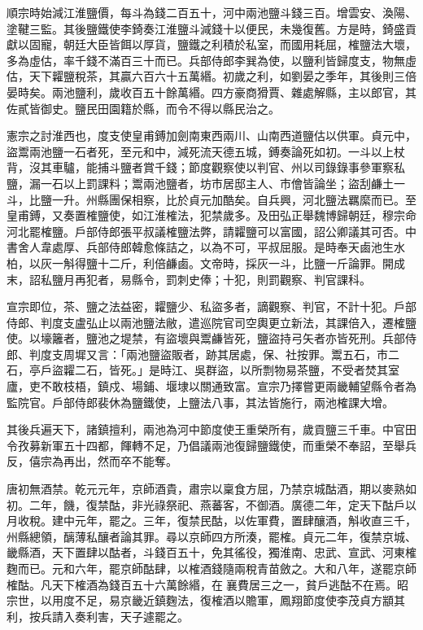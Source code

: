 \begin{pinyinscope}
 順宗時始減江淮鹽價，每斗為錢二百五十，河中兩池鹽斗錢三百。增雲安、渙陽、塗鞬三監。其後鹽鐵使李錡奏江淮鹽斗減錢十以便民，未幾復舊。方是時，錡盛貢獻以固寵，朝廷大臣皆餌以厚貨，鹽鐵之利積於私室，而國用耗屈，榷鹽法大壞，多為虛估，率千錢不滿百三十而已。兵部侍郎李巽為使，以鹽利皆歸度支，物無虛估，天下糶鹽稅茶，其贏六百六十五萬緡。初歲之利，如劉晏之季年，其後則三倍晏時矣。兩池鹽利，歲收百五十餘萬緡。四方豪商猾賈、雜處解縣，主以郎官，其佐貳皆御史。鹽民田園籍於縣，而令不得以縣民治之。



 憲宗之討淮西也，度支使皇甫鎛加劍南東西兩川、山南西道鹽估以供軍。貞元中，盜鬻兩池鹽一石者死，至元和中，減死流天德五城，鎛奏論死如初。一斗以上杖背，沒其車驢，能捕斗鹽者賞千錢；節度觀察使以判官、州以司錄錄事參軍察私鹽，漏一石以上罰課料；鬻兩池鹽者，坊市居邸主人、市儈皆論坐；盜刮鹻土一斗，比鹽一升。州縣團保相察，比於貞元加酷矣。自兵興，河北鹽法羈縻而已。至皇甫鎛，又奏置榷鹽使，如江淮榷法，犯禁歲多。及田弘正舉魏博歸朝廷，穆宗命河北罷榷鹽。戶部侍郎張平叔議榷鹽法弊，請糶鹽可以富國，詔公卿議其可否。中書舍人韋處厚、兵部侍郎韓愈條詰之，以為不可，平叔屈服。是時奉天鹵池生水柏，以灰一斛得鹽十二斤，利倍鹻鹵。文帝時，採灰一斗，比鹽一斤論罪。開成末，詔私鹽月再犯者，易縣令，罰刺史俸；十犯，則罰觀察、判官課科。



 宣宗即位，茶、鹽之法益密，糶鹽少、私盜多者，謫觀察、判官，不計十犯。戶部侍郎、判度支盧弘止以兩池鹽法敝，遣巡院官司空輿更立新法，其課倍入，遷榷鹽使。以壕籬者，鹽池之堤禁，有盜壞與鬻鹻皆死，鹽盜持弓矢者亦皆死刑。兵部侍郎、判度支周墀又言：「兩池鹽盜販者，跡其居處，保、社按罪。鬻五石，市二石，亭戶盜糶二石，皆死。」是時江、吳群盜，以所剽物易茶鹽，不受者焚其室廬，吏不敢枝梧，鎮戍、場鋪、堰埭以關通致富。宣宗乃擇嘗更兩畿輔望縣令者為監院官。戶部侍郎裴休為鹽鐵使，上鹽法八事，其法皆施行，兩池榷課大增。



 其後兵遍天下，諸鎮擅利，兩池為河中節度使王重榮所有，歲貢鹽三千車。中官田令孜募新軍五十四都，餫轉不足，乃倡議兩池復歸鹽鐵使，而重榮不奉詔，至舉兵反，僖宗為再出，然而卒不能奪。



 唐初無酒禁。乾元元年，京師酒貴，肅宗以稟食方屈，乃禁京城酤酒，期以麥熟如初。二年，饑，復禁酤，非光祿祭祀、燕蕃客，不御酒。廣德二年，定天下酤戶以月收稅。建中元年，罷之。三年，復禁民酤，以佐軍費，置肆釀酒，斛收直三千，州縣總領，醨薄私釀者論其罪。尋以京師四方所湊，罷榷。貞元二年，復禁京城、畿縣酒，天下置肆以酤者，斗錢百五十，免其徭役，獨淮南、忠武、宣武、河東榷麴而已。元和六年，罷京師酤肆，以榷酒錢隨兩稅青苗斂之。大和八年，遂罷京師榷酤。凡天下榷酒為錢百五十六萬餘緡，在襄費居三之一，貧戶逃酤不在焉。昭宗世，以用度不足，易京畿近鎮麴法，復榷酒以贍軍，鳳翔節度使李茂貞方顓其利，按兵請入奏利害，天子遽罷之。




\end{pinyinscope}
